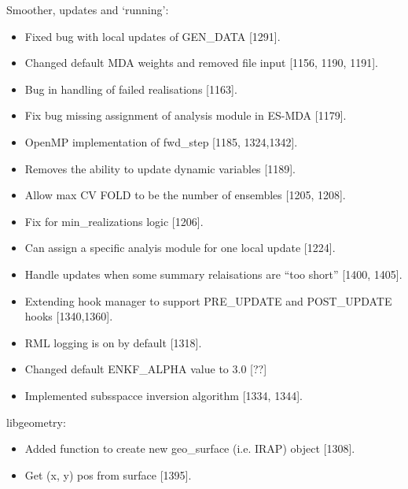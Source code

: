 \documentclass[letterpaper,10pt,english]{sphinxmanual}
\begin{document}
Smoother, updates and ‘running’:
\begin{itemize}
\item {} 
Fixed bug with local updates of GEN\_DATA {[}1291{]}.

\item {} 
Changed default MDA weights and removed file input {[}1156, 1190, 1191{]}.

\item {} 
Bug in handling of failed realisations {[}1163{]}.

\item {} 
Fix bug missing assignment of analysis module in ES-MDA {[}1179{]}.

\item {} 
OpenMP implementation of fwd\_step {[}1185, 1324,1342{]}.

\item {} 
Removes the ability to update dynamic variables {[}1189{]}.

\item {} 
Allow max CV FOLD to be the number of ensembles {[}1205, 1208{]}.

\item {} 
Fix for min\_realizations logic {[}1206{]}.

\item {} 
Can assign a specific analyis module for one local update {[}1224{]}.

\item {} 
Handle updates when some summary relaisations are “too short” {[}1400, 1405{]}.

\item {} 
Extending hook manager to support PRE\_UPDATE and POST\_UPDATE hooks {[}1340,1360{]}.

\item {} 
RML logging is on by default {[}1318{]}.

\item {} 
Changed default ENKF\_ALPHA value to 3.0 {[}??{]}

\item {} 
Implemented subsspacce inversion algorithm {[}1334, 1344{]}.

\end{itemize}

libgeometry:
\begin{itemize}
\item {} 
Added function to create new geo\_surface (i.e. IRAP) object {[}1308{]}.

\item {} 
Get (x, y) pos from surface {[}1395{]}.

\end{itemize}
\end{document}
